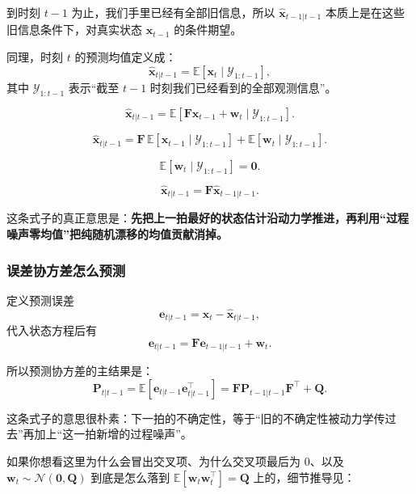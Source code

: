 \documentclass[12pt,a4paper]{ctexart}
\begin{document}
到时刻 \(t-1\) 为止，我们手里已经有全部旧信息，所以
\(\hat{\bm{x}}_{t-1|t-1}\)
本质上是在这些旧信息条件下，对真实状态
\(\bm{x}_{t-1}\)
的条件期望。

同理，时刻 \(t\) 的预测均值定义成：
\[
\hat{\bm{x}}_{t|t-1}
= \mathbb{E}[\bm{x}_t \mid \mathcal{Y}_{1:t-1}],
\]
其中
\(\mathcal{Y}_{1:t-1}\)
表示“截至 \(t-1\) 时刻我们已经看到的全部观测信息”。


\[
\hat{\bm{x}}_{t|t-1}
= \mathbb{E}[\bm{F}\bm{x}_{t-1} + \bm{w}_t \mid \mathcal{Y}_{1:t-1}].
\]


\[
\hat{\bm{x}}_{t|t-1}
= \bm{F}\,\mathbb{E}[\bm{x}_{t-1} \mid \mathcal{Y}_{1:t-1}]
+ \mathbb{E}[\bm{w}_t \mid \mathcal{Y}_{1:t-1}].
\]


\[
\mathbb{E}[\bm{w}_t \mid \mathcal{Y}_{1:t-1}] = \bm{0}.
\]


\[
\hat{\bm{x}}_{t|t-1} = \bm{F}\hat{\bm{x}}_{t-1|t-1}.
\]

这条式子的真正意思是：\textbf{先把上一拍最好的状态估计沿动力学推进，再利用“过程噪声零均值”把纯随机漂移的均值贡献消掉。}

\subsubsection{误差协方差怎么预测}

定义预测误差
\[
\bm{e}_{t|t-1} = \bm{x}_t - \hat{\bm{x}}_{t|t-1},
\]
代入状态方程后有
\[
\bm{e}_{t|t-1} = \bm{F}\bm{e}_{t-1|t-1} + \bm{w}_t.
\]

所以预测协方差的主结果是：
\[
\bm{P}_{t|t-1}
= \mathbb{E}[\bm{e}_{t|t-1}\bm{e}_{t|t-1}^\top]
= \bm{F}\bm{P}_{t-1|t-1}\bm{F}^\top + \bm{Q}.
\]

这条式子的意思很朴素：下一拍的不确定性，等于“旧的不确定性被动力学传过去”再加上“这一拍新增的过程噪声”。

如果你想看这里为什么会冒出交叉项、为什么交叉项最后为 0、以及
\(\bm{w}_t \sim \mathcal{N}(\bm{0},\bm{Q})\)
到底是怎么落到
\(\mathbb{E}[\bm{w}_t\bm{w}_t^\top]=\bm{Q}\)
上的，细节推导见：
\end{document}
